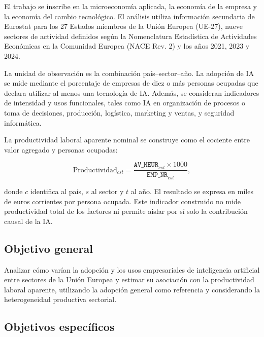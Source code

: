 \documentclass[12pt,a4paper]{article}
\begin{document}
El trabajo se inscribe en la microeconomía aplicada, la economía de la empresa y la economía del cambio tecnológico. El análisis utiliza información secundaria de Eurostat para los 27 Estados miembros de la Unión Europea (UE-27), nueve sectores de actividad definidos según la Nomenclatura Estadística de Actividades Económicas en la Comunidad Europea (NACE Rev. 2) y los años 2021, 2023 y 2024.

La unidad de observación es la combinación país--sector--año. La adopción de IA se mide mediante el porcentaje de empresas de diez o más personas ocupadas que declara utilizar al menos una tecnología de IA. Además, se consideran indicadores de intensidad y usos funcionales, tales como IA en organización de procesos o toma de decisiones, producción, logística, marketing y ventas, y seguridad informática.

La productividad laboral aparente nominal se construye como el cociente entre valor agregado y personas ocupadas:

\begin{equation}
  \text{Productividad}_{cst} = \frac{\texttt{AV\_MEUR}_{cst}\times 1000}{\texttt{EMP\_NR}_{cst}},
\end{equation}

donde $c$ identifica al país, $s$ al sector y $t$ al año. El resultado se expresa en miles de euros corrientes por persona ocupada. Este indicador construido no mide productividad total de los factores ni permite aislar por sí solo la contribución causal de la IA.

\subsection{Objetivo general}

Analizar cómo varían la adopción y los usos empresariales de inteligencia artificial entre sectores de la Unión Europea y estimar su asociación con la productividad laboral aparente, utilizando la adopción general como referencia y considerando la heterogeneidad productiva sectorial.

\subsection{Objetivos específicos}
\end{document}
